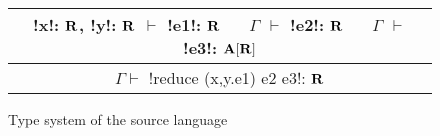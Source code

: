 \begin{figure*}[tb]
    \begin{tabular}{c}
        !x!: $\mathbf{R}$, !y!: $\mathbf{R}$ $\vdash$ !e1!: $\mathbf{R}$ 
        $\quad$ $\Gamma$ $\vdash$ !e2!: $\mathbf{R}$
        $\quad$ $\Gamma$ $\vdash$ !e3!: $\mathbf{A}[\mathbf{R}]$
        \\\hline  
        $\Gamma \vdash$ !reduce (x,y.e1) e2 e3!: $\mathbf{R}$
    \end{tabular}
    \vspace{-0.2cm}
    \caption{Type system of the source language}
    \vspace{-0.4cm}
    \label{fig:source_typesystem}
    \end{figure*}